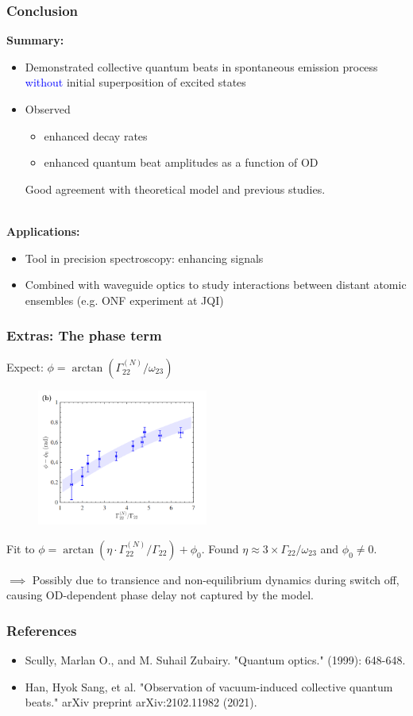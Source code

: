 \documentclass{beamer}
\theoremstyle{definition}
\begin{document}
\begin{frame}
	
	\frametitle{Conclusion}
	\textbf{Summary:}
	
	\begin{itemize}
		\item Demonstrated collective quantum beats in spontaneous emission process \textcolor{blue}{without} initial superposition of excited states
		
		\item Observed 
		\begin{itemize}
			\item enhanced decay rates
			\item enhanced quantum beat amplitudes as a function of OD
		\end{itemize}
		Good agreement with theoretical model and previous studies.

	\end{itemize}


	$\,$\\
	\textbf{Applications:}
	\begin{itemize}
		\item Tool in precision spectroscopy: enhancing signals
		
		\item Combined with waveguide optics to study interactions between distant atomic ensembles (e.g. ONF experiment at JQI)
	\end{itemize}
\end{frame}



\begin{frame}
	\frametitle{Extras: The phase term}
	Expect: $\phi = \arctan(\Gamma_{22}^{(N)}/\omega_{23})$
	\begin{figure}[!htb]
		\centering
		\includegraphics[width=0.5\textwidth]{phase}
	\end{figure}
	Fit to $
	\phi = \arctan(\eta \cdot \Gamma_{22}^{(N)}/\Gamma_{22}) + \phi_0$. Found $\eta \approx 3 \times \Gamma_{22}/\omega_{23}$ and $\phi_0 \neq 0$. 
	
	$\implies$ Possibly due to transience and non-equilibrium dynamics during switch off, causing OD-dependent phase delay not captured by the model. 
	
\end{frame}


\begin{frame}
\frametitle{References}
\begin{itemize}
	\item Scully, Marlan O., and M. Suhail Zubairy. "Quantum optics." (1999): 648-648.
	
	\item Han, Hyok Sang, et al. "Observation of vacuum-induced collective quantum beats." arXiv preprint arXiv:2102.11982 (2021).
\end{itemize}
\end{frame}
\end{document}
